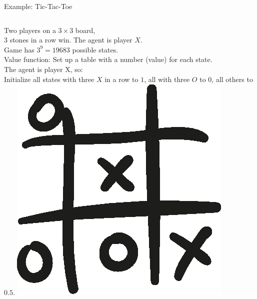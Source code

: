 \documentclass{beamer}
\begin{document}
\begin{frame}{Example: Tic-Tac-Toe}
	\begin{columns}
		Two players on a $3 \times 3$ board, \\
		$3$ stones in a row win. The agent is player $X$.\\
		\vspace{0.5cm}
		Game has $3^9 = 19683$ possible states.\\
		Value function: Set up a table with a number (value) for each state. \\
		\vspace{0.5cm}
		The agent is player X, so: \\
		Initialize all states with three $X$ in a row to $1$, all with three $O$ to $0$, all others to $0.5$.
		\includegraphics[width=\linewidth]{Images/tic-tac-toe-hand-drawn-game.eps}\\
	\end{columns}
\end{frame}
\end{document}
